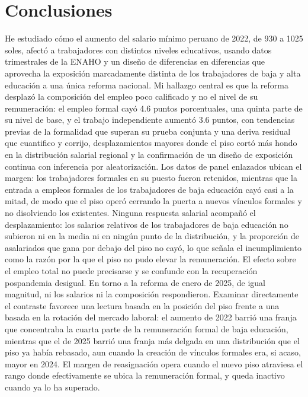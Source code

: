 \section{Conclusiones}\label{sec:conclusion}

He estudiado cómo el aumento del salario mínimo peruano de 2022, de 930 a 1025 soles, afectó a trabajadores con distintos niveles educativos, usando datos trimestrales de la ENAHO y un diseño de diferencias en diferencias que aprovecha la exposición marcadamente distinta de los trabajadores de baja y alta educación a una única reforma nacional. Mi hallazgo central es que la reforma desplazó la composición del empleo poco calificado y no el nivel de su remuneración: el empleo formal cayó 4.6 puntos porcentuales, una quinta parte de su nivel de base, y el trabajo independiente aumentó 3.6 puntos, con tendencias previas de la formalidad que superan su prueba conjunta y una deriva residual que cuantifico y corrijo, desplazamientos mayores donde el piso cortó más hondo en la distribución salarial regional y la confirmación de un diseño de exposición continua con inferencia por aleatorización. Los datos de panel enlazados ubican el margen: los trabajadores formales en su puesto fueron retenidos, mientras que la entrada a empleos formales de los trabajadores de baja educación cayó casi a la mitad, de modo que el piso operó cerrando la puerta a nuevos vínculos formales y no disolviendo los existentes. Ninguna respuesta salarial acompañó el desplazamiento: los salarios relativos de los trabajadores de baja educación no subieron ni en la media ni en ningún punto de la distribución, y la proporción de asalariados que gana por debajo del piso no cayó, lo que señala el incumplimiento como la razón por la que el piso no pudo elevar la remuneración. El efecto sobre el empleo total no puede precisarse y se confunde con la recuperación pospandemia desigual. En torno a la reforma de enero de 2025, de igual magnitud, ni los salarios ni la composición respondieron. Examinar directamente el contraste favorece una lectura basada en la posición del piso frente a una basada en la rotación del mercado laboral: el aumento de 2022 barrió una franja que concentraba la cuarta parte de la remuneración formal de baja educación, mientras que el de 2025 barrió una franja más delgada en una distribución que el piso ya había rebasado, aun cuando la creación de vínculos formales era, si acaso, mayor en 2024. El margen de reasignación opera cuando el nuevo piso atraviesa el rango donde efectivamente se ubica la remuneración formal, y queda inactivo cuando ya lo ha superado.

